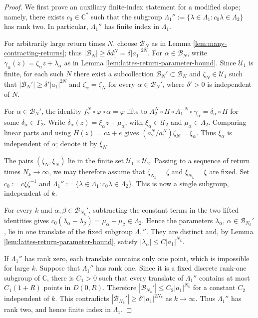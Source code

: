\documentclass[11pt]{amsart}
\numberwithin{equation}{section}
\theoremstyle{plain}
\theoremstyle{definition}
\theoremstyle{remark}
\begin{document}
\begin{proof}
We first prove an auxiliary finite-index statement for a modified
slope; namely, there exists $c_0\in\mathbb C^*$ such that the subgroup
$\Lambda_1'':=\{\lambda\in\Lambda_1:c_0\lambda\in\Lambda_2\}$
has rank two. In particular, $\Lambda_1''$ has finite index in
$\Lambda_1$.

For arbitrarily large return times $N$, choose
$\mathscr B_N$ as in Lemma \ref{lem:many-contracting-returns}; thus
$|\mathscr B_N|\geq\delta d_1^N=\delta|a_1|^{2N}$. For
$\alpha\in\mathscr B_N$, write
$\gamma_\alpha(z)=\zeta_\alpha z+\lambda_\alpha$ as in Lemma
\ref{lem:lattes-return-parameter-bound}. Since $\mathcal U_1$ is
finite, for each such $N$ there exist
a subcollection
$\mathscr B_N'\subset\mathscr B_N$ and
$\zeta_N\in\mathcal U_1$ such that
$|\mathscr B_N'|\geq\delta'|a_1|^{2N}$ and
$\zeta_\alpha=\zeta_N$ for every
$\alpha\in\mathscr B_N'$, where $\delta'>0$ is independent of $N$.

For $\alpha\in\mathscr B_N'$, the identity
$f_2^N\circ\varphi\circ\alpha=\varphi$ lifts to
$A_2^N\circ H\circ A_1^{-N}\circ\gamma_\alpha
=\delta_\alpha\circ H$ for some
$\delta_\alpha\in\Gamma_2$. Write
$\delta_\alpha(z)=\xi_\alpha z+\mu_\alpha$, with
$\xi_\alpha\in\mathcal U_2$ and $\mu_\alpha\in\Lambda_2$.
Comparing linear parts and using $H(z)=cz+e$ gives
$(a_2^N/a_1^N)\zeta_N=\xi_\alpha$. Thus $\xi_\alpha$ is independent
of $\alpha$; denote it by $\xi_N$.

The pairs $(\zeta_N,\xi_N)$ lie in the finite set
$\mathcal U_1\times\mathcal U_2$. Passing to a sequence of return
times $N_k\to\infty$, we may therefore assume that
$\zeta_{N_k}=\zeta$ and $\xi_{N_k}=\xi$ are fixed. Set
$c_0:=c\xi\zeta^{-1}$ and
$\Lambda_1'':=\{\lambda\in\Lambda_1:c_0\lambda\in\Lambda_2\}$.
This is now a single subgroup, independent of $k$.

For every $k$ and
$\alpha,\beta\in\mathscr B_{N_k}'$, subtracting the constant terms
in the two lifted identities gives
$c_0(\lambda_\alpha-\lambda_\beta)
=\mu_\alpha-\mu_\beta\in\Lambda_2$. Hence the parameters
$\lambda_\alpha$, $\alpha\in\mathscr B_{N_k}'$, lie in one translate
of the fixed subgroup $\Lambda_1''$. They are distinct and, by Lemma
\ref{lem:lattes-return-parameter-bound}, satisfy
$|\lambda_\alpha|\leq C|a_1|^{N_k}$.

If $\Lambda_1''$ has rank zero, each translate contains only one
point, which is impossible for large $k$. Suppose that
$\Lambda_1''$ has rank one. Since it is a fixed discrete rank-one
subgroup of $\mathbb C$, there is $C_1>0$ such that every translate
of $\Lambda_1''$ contains at most $C_1(1+R)$ points in $D(0,R)$.
Therefore
$|\mathscr B_{N_k}'|\leq C_2|a_1|^{N_k}$ for a constant $C_2$
independent of $k$. This contradicts
$|\mathscr B_{N_k}'|\geq\delta'|a_1|^{2N_k}$ as $k\to\infty$.
Thus $\Lambda_1''$ has rank two, and hence finite index in
$\Lambda_1$.


\end{proof}
\end{document}
